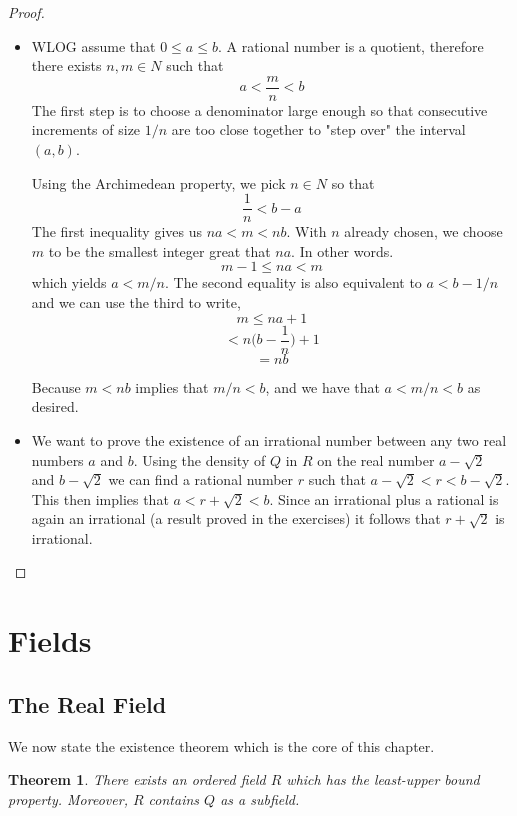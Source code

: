 \documentclass{tufte-book}
\newtheorem{theorem}{Theorem}[chapter]
\theoremstyle{definition}
\numberwithin{section}{chapter}
\begin{document}
 \begin{proof}
 \begin{itemize}[(i)]
 	\item WLOG assume that  $0 \leq a \leq b$.  A rational number is a quotient, therefore there exists $n,m \in N$ such that 
	\[	a  < \frac{m}{n} < b	\]
 The first step is to choose a denominator large enough so that consecutive increments of size $1/n$ are too close together to "step over" the interval $(a,b)$.
 
 Using the Archimedean property, we pick $n \in N$ so that 
 \[		\frac{1}{n} < b-a\]
The first inequality gives us $na < m <nb$.  With $n$ already chosen, we choose $m$ to be the smallest integer great that $na$.  In other words.
$$m-1 \leq na < m$$ 
which yields $a < m/n$.  The second equality is also equivalent to $a< b - 1/n$ and we can use the third to write,
$$  m \leq na +1$$
$$<  n \big( b - \frac{1}{n} \big) + 1 $$
$$ = nb $$

Because $m<nb$ implies that $m/n < b$, and we have that $a<m/n <b$ as desired.

\item  We want to prove the existence of an irrational number between any two real numbers $a$ and $b$.  Using the density of $Q$ in $R$ on the real number $a - \sqrt{2}$ and $b - \sqrt{2}$ we can find a rational number $r$ such that $a - \sqrt{2} < r < b - \sqrt{2}$.  This then implies that $a< r + \sqrt{2} < b$.  Since an irrational plus a rational is again an irrational (a result proved in the exercises) it follows that $r + \sqrt{2}$ is irrational.

 
 \end{itemize}
 \end{proof}





\section{Fields}
\subsection{The Real Field}

We now state the existence theorem which is the core of this chapter.

\begin{theorem}  There exists an ordered field $R$ which has the least-upper bound property.   Moreover, $R$ contains $Q$ as a subfield. \end{theorem}
\end{document}
